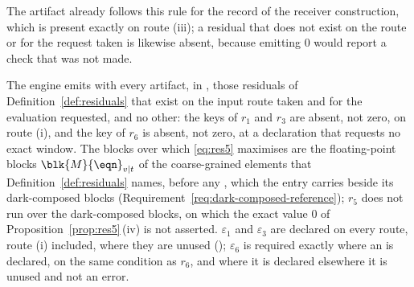 
The artifact already follows this rule for the record of the receiver
construction, which is present exactly on route (iii); a residual that does
not exist on the route or for the request taken is likewise absent, because
emitting $0$ would report a check that was not made.

\begin{requirement}\label{req:residual-emission}
The engine emits with every artifact, in , those
residuals of Definition~\ref{def:residuals} that exist on the input route taken
and for the evaluation requested, and no other: the keys of $r_1$ and $r_3$ are
absent, not zero, on route (i), and the key of $r_6$ is absent, not zero, at a
declaration that requests no exact window. The blocks over which
\eqref{eq:res5} maximises are the floating-point blocks
$\blk{M}{\eqn}_{v|t}$ of the coarse-grained elements that
Definition~\ref{def:residuals} names, before any , which
the  entry carries beside its dark-composed blocks
(Requirement~\ref{req:dark-composed-reference}); $r_5$ does not run over the
dark-composed blocks, on which the exact value $0$ of
Proposition~\ref{prop:res5}\,(iv) is not asserted.
$\varepsilon_1$ and $\varepsilon_3$ are declared on every route, route (i)
included, where they are unused ();
$\varepsilon_6$ is required exactly where an  is
declared, on the same condition as $r_6$, and where it is declared elsewhere
it is unused and not an error.
\end{requirement}
